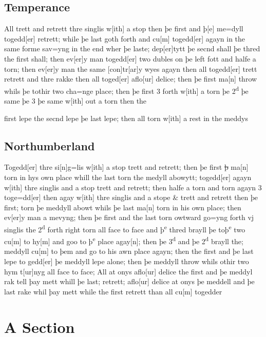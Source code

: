 \documentclass[12pt,letter]{article} %
\newcommand{\srcpg}[1]{
    \noindent{
        \color{Gray}{\rule[0.5ex]{\linewidth}{1pt}~#1} 
    
    }
}
\begin{document}
\srcpg{70}

\subsection{Temperance}
 All trett and retrett thre singlis w{[}ith{]} a stop then þe first and þ{[}e{]} me=dyll togedd{[}er{]} retrett; while þe last goth forth and cu{[}m{]} togedd{[}er{]} agayn in the same forme sav=yng in the end wher þe laste; dep{[}er{]}tytt þe secnd shall þe thred the first shall; then ev{[}er{]}y man togedd{[}er{]} two dubles on þe left fott and halfe a torn; then ev{[}er{]}y man the same {[}con{]}tr{[}ar{]}y wyes agayn then all togedd{[}er{]} trett retrett and thre rakke then all toged{[}er{]} aflo{[}ur{]} delice; then þe first ma{[}n{]} throw whils þe tothir two cha=nge place; then þe first 3 forth w{[}ith{]} a torn þe 2\textsuperscript{d} þe same þe 3 þe same w{[}ith{]} out a torn then the 
\srcpg{71} 
first lepe the secnd lepe þe last lepe; then all torn w{[}ith{]} a rest in the meddys

\subsection{Northumberland}
Togedd{[}er{]} thre si{[}n{]}g=lis w{[}ith{]} a stop trett and retrett; then þe first \sout{þ} ma{[}n{]} torn in hys own place whill the last torn the medyll abowytt; togedd{[}er{]} agayn w{[}ith{]} thre singlis and a stop trett and retrett; then halfe a torn and torn agayn 3 toge=dd{[}er{]} then agay w{[}ith{]} thre singlis and a stope \& trett and retrett then þe first; torn þe meddyll abowt whils þe last ma{[}n{]} torn in his own place; then ev{[}er{]}y man a mevyng; then þe first and the last torn owtward go=yng forth vj singlis the 2\textsuperscript{d} forth \srcpg{72} right torn all face to face and þ\textsuperscript{e} thred brayll þe toþ\textsuperscript{e} two cu{[}m{]} to hy{[}m{]} and goo to þ\textsuperscript{e} place agay{[}n{]}; then þe 3\textsuperscript{d} and þe 2\textsuperscript{d} brayll the; meddyll cu{[}m{]} to þem and go to his awn place agayn; then the first and þe last lepe to gedd{[}er{]} þe meddyll lepe alone; then þe meddyll throw whils othir two hym t{[}ur{]}nyg all face to face; All at onys aflo{[}ur{]} delice the first and þe meddyl rak tell þay mett whill þe last; retrett; aflo{[}ur{]} delice at onys þe meddell and þe last rake whil þay mett while the first retrett than all cu{[}m{]} togedder

\newpage

    \section{A Section}
    \lipsum[1]
    
    \nocite{*}
    
    
\end{document}
